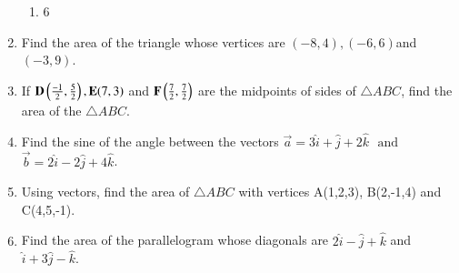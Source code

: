 \begin{enumerate}[label=\thesubsection.\arabic*,ref=\thesubsection.\theenumi]
\begin{enumerate}
\item 6
\end{enumerate}
\item Find the area of the triangle whose vertices are $(-8,4),(-6,6)$and $(-3,9)$.
\item If $\mathbf{D}\left(\frac{-1}{2},\frac{5}{2}\right),\mathbf{E}(7,3)$ and $\mathbf{F}\left(\frac{7}{2},\frac{7}{2}\right)$ are the midpoints of sides of $\triangle ABC$, find the area of the $\triangle ABC$.
\item Find the sine of the angle between the vectors $\vec{a}=3\hat{i}+\hat{j}+2\hat{k}$ $\text{ and }$ $\vec{b}=2\hat{i}-2\hat{j}+4\hat{k}$.
\item Using vectors, find the area of $\triangle{ABC}$ with vertices A(1,2,3), B(2,-1,4) and C(4,5,-1).
\item Find the area of the parallelogram whose diagonals are $2\hat{i}-\hat{j}+\hat{k}$ and $\hat{i}+3\hat{j}-\hat{k}$.


\end{enumerate}
